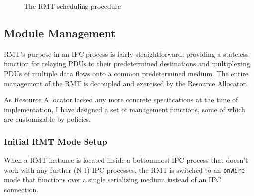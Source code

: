             \begin{figure}[H]
                \begin{center}
                  \caption{The RMT scheduling procedure}
                  \label{fig:sched-petri}
                \end{center}
            \end{figure}

        \subsection{Module Management}\label{implementation:mgmt}

            RMT's purpose in an IPC process is fairly straightforward: providing a stateless function for relaying PDUs to their predetermined destinations and multiplexing PDUs of multiple data flows onto a common predetermined medium. The entire management of the RMT is decoupled and exercised by the Resource Allocator.

            As Resource Allocator lacked any more concrete specifications at the time of implementation, I have designed a set of management functions, some of which are customizable by policies.

            \subsubsection{Initial RMT Mode Setup}

                When a RMT instance is located inside a bottommost IPC process that doesn't work with any further (N-1)-IPC processes, the RMT is switched to an \texttt{onWire} mode that functions over a single serializing medium instead of an IPC connection.


